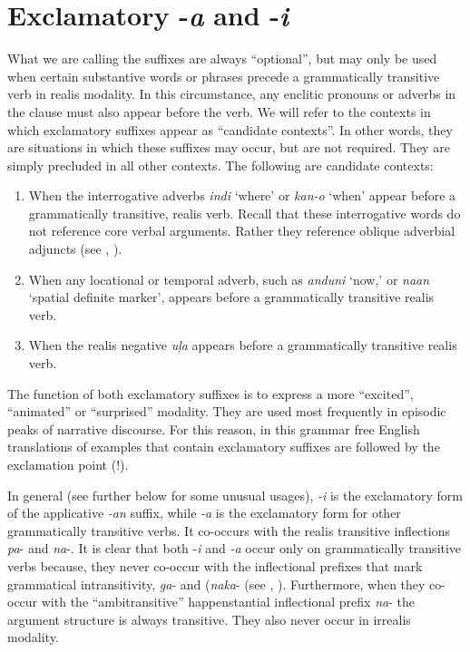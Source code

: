 \section{Exclamatory -\textit{a} and -\textit{i}}
\label{sec:exclamatory}

What we are calling the  suffixes are always “optional”, but may only be used when certain substantive words or phrases precede a grammatically transitive verb in realis modality. In this circumstance, any enclitic pronouns or adverbs in the clause must also appear before the verb. We will refer to the contexts in which exclamatory suffixes appear as “candidate contexts”. In other words, they are situations in which these suffixes may occur, but are not required. They are simply precluded in all other contexts. The following are candidate contexts:

\begin{enumerate}
\item When the interrogative adverbs \textit{indi} ‘where’ or \textit{kan-o} ‘when’ appear before a grammatically transitive, realis verb. Recall that these interrogative words do not reference core verbal arguments. Rather they reference oblique adverbial adjuncts (see , ).
\item When any locational or temporal adverb, such as \textit{anduni} ‘now,’ or \textit{naan} ‘spatial definite marker’, appears before a grammatically transitive realis verb.
\item When the realis negative \textit{uļa} appears before a grammatically transitive realis verb.
\end{enumerate}


The function of both exclamatory suffixes is to express a more “excited”, “animated” or “surprised” modality. They are used most frequently in episodic peaks of narrative discourse. For this reason, in this grammar free English translations of examples that contain exclamatory suffixes are followed by the exclamation point (!).

In general (see further below for some unusual usages), \textit{{}-i} is the exclamatory form of the applicative \textit{{}-an} suffix, while \textit{{}-a} is the exclamatory form for other grammatically transitive verbs. It co-occurs with the realis transitive inflections \textit{pa}{}- and \textit{na}{}-. It is clear that both -\textit{i} and \textit{-a} occur only on grammatically transitive verbs because, they never co-occur with the inflectional prefixes that mark grammatical intransitivity, \textit{ga}{}- and (\textit{naka}{}- (see , ). Furthermore, when they co-occur with the “ambitransitive” happenstantial inflectional prefix \textit{na}{}- the argument structure is always transitive. They also never occur in irrealis modality.

